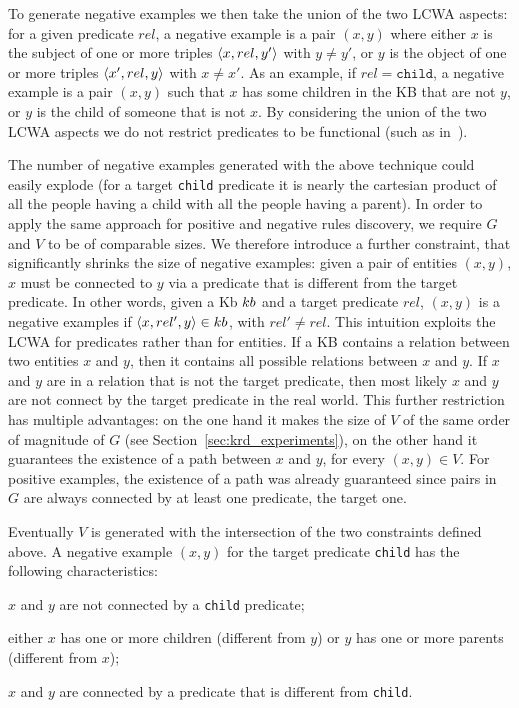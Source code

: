To generate negative examples we then take the union of the two LCWA aspects: for a given predicate $rel$, a negative example is a pair $(x,y)$ where either $x$ is the subject of one or more triples $\langle x,rel,y'\rangle$ with $y \neq y'$, or $y$ is the object of one or more triples $\langle x',rel,y\rangle$ with $x \neq x'$. As an example, if $rel=\texttt{child}$, a negative example is a pair $(x,y)$ such that $x$ has some children in the KB that are not $y$, or $y$ is the child of someone that is not $x$. By considering the union of the two LCWA aspects we do not restrict predicates to be functional (such as in~\cite{galarraga2015fast}). 

The number of negative examples generated with the above technique could easily explode (for a target \texttt{child} predicate it is nearly the cartesian product of all the people having a child with all the people having a parent). In order to apply the same approach for positive and negative rules discovery, we require $G$ and $V$ to be of comparable sizes. We therefore introduce a further constraint, that significantly shrinks the size of negative examples: given a pair of entities $(x,y)$, $x$ must be connected to $y$ via a predicate that is different from the target predicate. In other words, given a Kb ${\sc kb}$ and a target predicate $rel$, $(x,y)$ is a negative examples if $\langle x,rel',y\rangle \in {\sc kb}$, with $rel' \neq rel$. This intuition exploits the LCWA for predicates rather than for entities. If a KB contains a relation between two entities $x$ and $y$, then it contains all possible relations between $x$ and $y$. If $x$ and $y$ are in a relation that is not the target predicate, then most likely $x$ and $y$ are not connect by the target predicate in the real world. This further restriction has multiple advantages: on the one hand it makes the size of $V$ of the same order of magnitude of $G$ (see Section~\ref{sec:krd_experiments}), on the other hand it guarantees the existence of a path between $x$ and $y$, for every $(x,y) \in V$. For positive examples, the existence of a path was already guaranteed since pairs in $G$ are always connected by at least one predicate, the target one.

Eventually $V$ is generated with the intersection of the two constraints defined above. A negative example $(x,y)$ for the target predicate \texttt{child} has the following characteristics:
\begin{inparaenum}[\itshape(i)]
	\item $x$ and $y$ are not connected by a \texttt{child} predicate;
	\item either $x$ has one or more children (different from $y$) or $y$ has one or more parents (different from $x$);
	\item $x$ and $y$ are connected by a predicate that is different from \texttt{child}.
\end{inparaenum}

